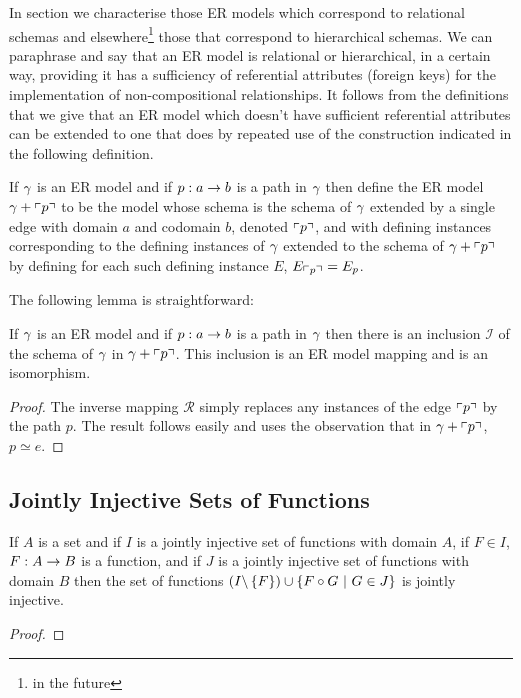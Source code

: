 In section  we characterise those ER models which correspond to relational schemas and elsewhere\footnote{in the future} those that correspond to hierarchical schemas. 
We can paraphrase and say that an ER model is relational or hierarchical, in a certain way,  providing it has a sufficiency of referential attributes (foreign keys) for the implementation  of non-compositional relationships. It follows from the definitions that we give that an ER model which doesn't have sufficient 
referential attributes can be extended to one that does by repeated use of the construction indicated in the following definition.
\begin{definition}
If $\gamma$ is an ER model and if $p:a \rightarrow b$ is a path in $\gamma$ then define the ER model $\gamma + \left\ulcorner p\right\urcorner$ to be the model whose schema is the schema of $\gamma$ extended by a single edge with domain $a$ and codomain $b$, denoted $\left\ulcorner p\right\urcorner$, and with defining instances corresponding to the defining instances of $\gamma$ extended to the schema of $\gamma + \left\ulcorner p\right\urcorner$ by defining for each such defining instance $E$, $E_{\left\ulcorner p\right\urcorner}=E_p$.
\end{definition} 


The following lemma is straightforward:
\begin{lemma}
If $\gamma$ is an ER model and if $p:a \rightarrow b$ is a path in $\gamma$ then
there is an inclusion  $\mathcal{I}$ of the schema of $\gamma$ in $\gamma + \left\ulcorner p\right\urcorner$. This inclusion is an ER model mapping and is an isomorphism. 
\end{lemma}
\begin{proof}
The inverse mapping $\mathcal{R}$ simply replaces any instances of the edge $\left\ulcorner p\right\urcorner$ by the path $p$. The result follows easily and uses the observation that in $\gamma + \left\ulcorner p\right\urcorner$, $p \simeq e$.
\end{proof}


\subsection{Jointly Injective Sets of Functions}
\begin{lemma}
If $A$ is a set and if $I$  is a jointly injective set of functions with domain $A$, if $F \in I$, $F: A \rightarrow B$ is a function,
and if $J$ is a jointly injective set of functions with domain $B$ then the set of functions
$(I \backslash \left\{F\right\}) \cup \left\{F \circ G \ \middle|\ G \in J\right\}$ is jointly injective.
\end{lemma}
\begin{proof}

\end{proof}

